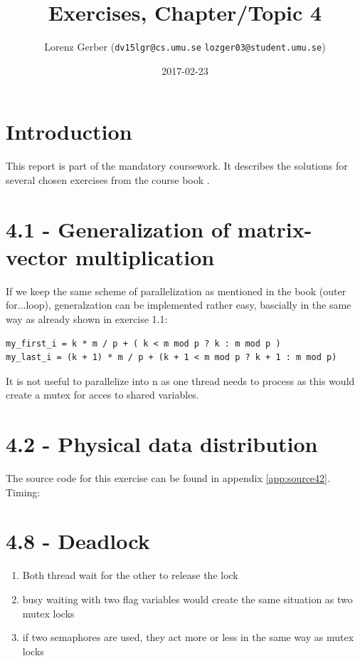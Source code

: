 \documentclass[a4paper,11pt,twoside]{article}
\title{Exercises, Chapter/Topic 4}
\author{Lorenz Gerber ({\tt{dv15lgr@cs.umu.se}} {\tt{lozger03@student.umu.se}})}
\date{2017-02-23}
\begin{document}
\lstset{language=C}
\maketitle
\thispagestyle{empty}
\newpage
\tableofcontents
\thispagestyle{empty}
\newpage

\clearpage
{}

\section{Introduction}
This report is part of the mandatory coursework. It describes the solutions for several chosen exercises from the course book \cite{pacheco2011}.
\section{4.1 - Generalization of matrix-vector multiplication}
If we keep the same scheme of parallelization as mentioned in the book (outer for...loop), generalzation can be implemented rather easy, bascially in the same way as already shown in exercise 1.1:

\begin{verbatim}                                                                                             
my_first_i = k * m / p + ( k < m mod p ? k : m mod p )                                                       
my_last_i = (k + 1) * m / p + (k + 1 < m mod p ? k + 1 : m mod p)  
\end{verbatim}

It is not useful to parallelize into n as one thread needs to process as this would create a mutex for acces to shared variables. 

\section{4.2 - Physical data distribution}
The source code for this exercise can be found in appendix \ref{app:source42}. Timing:


\section{4.8 - Deadlock}
\begin{enumerate}[label={\alph*)}]
\item Both thread wait for the other to release the lock
\item busy waiting with two flag variables would create the same situation as two mutex locks
\item if two semaphores are used, they act more or less in the same way as mutex locks
\end{enumerate}
  
\end{document}
